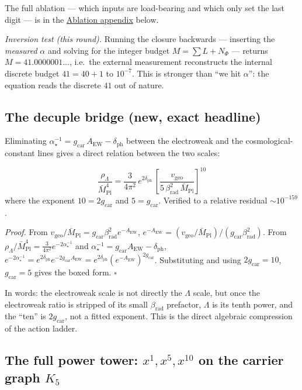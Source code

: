 \documentclass[11pt,a4paper]{article}
\newcommand{\Mbar}{\bar M_{\mathrm{Pl}}}
\newcommand{\gcar}{g_{\mathrm{car}}}
\newcommand{\dph}{\delta_{\mathrm{ph}}}
\newcommand{\betarad}{\beta_{\mathrm{rad}}}
\newcommand{\ainv}{\alpha^{-1}_\star}
\newcommand{\AEW}{A_{\mathrm{EW}}}
\theoremstyle{definition}
\begin{document}
\noindent The full ablation --- which inputs are load-bearing and which only set the last digit --- is in
the \hyperref[sec:ablation]{Ablation appendix} below.

\emph{Inversion test (this round).} Running the closure backwards --- inserting the \emph{measured}
$\alpha$ and solving for the integer budget $M=\sum L+N_\Phi$ --- returns
$M=41.0000001\ldots$, i.e.\ the external measurement reconstructs the internal discrete budget
$41=40+1$ to $10^{-7}$. This is stronger than ``we hit $\alpha$'': the equation reads the discrete
$41$ out of nature. \mE

\subsection{The decuple bridge (new, exact headline)}

Eliminating $\ainv=\gcar\,\AEW-\dph$ between the electroweak and the cosmological-constant lines
gives a direct relation between the two scales:

\begin{keybox}
\begin{equation}
  \boxed{\ \frac{\rho_\Lambda}{\Mbar^4}
  =\frac{3}{4\pi^2}\,e^{2\dph}\,
  \left[\frac{v_{\mathrm{geo}}}{5\,\betarad^2\,\Mbar}\right]^{10}\ }
\end{equation}
where the exponent $10=2\gcar$ and $5=\gcar$. Verified to a relative residual $\sim10^{-159}$.
\end{keybox}

\noindent\emph{Proof.} From $v_{\mathrm{geo}}/\Mbar=\gcar\betarad^2 e^{-\AEW}$,
$e^{-\AEW}=(v_{\mathrm{geo}}/\Mbar)/(\gcar\betarad^2)$. From
$\rho_\Lambda/\Mbar^4=\tfrac{3}{4\pi^2}e^{-2\ainv}$ and $\ainv=\gcar\AEW-\dph$,
$e^{-2\ainv}=e^{2\dph}e^{-2\gcar\AEW}=e^{2\dph}(e^{-\AEW})^{2\gcar}$. Substituting and using
$2\gcar=10$, $\gcar=5$ gives the boxed form. $\square$

\smallskip
In words: the electroweak scale is not directly the $\Lambda$ scale, but once the electroweak ratio
is stripped of its small $\betarad$ prefactor, $\Lambda$ is its tenth power, and the ``ten'' is
$2\gcar$, not a fitted exponent. This is the direct algebraic compression of the action ladder.

\subsection{The full power tower: $x^{1},x^{5},x^{10}$ on the carrier graph $K_5$}
\end{document}
